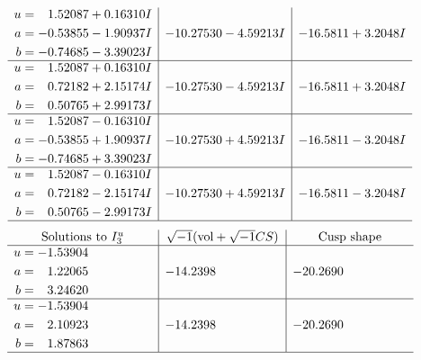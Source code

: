 \documentclass[1p]{elsarticle_modified}
\theoremstyle{definition}
\newcommand{\I}{\sqrt{-1}}
\begin{document}
$$\begin{array}{c|c|c}
\begin{aligned}
u &= \phantom{-}1.52087 + 0.16310 I \\
a &= -0.53855 - 1.90937 I \\
b &= -0.74685 - 3.39023 I\end{aligned}
 & -10.27530 - 4.59213 I & -16.5811 + 3.2048 I \\ \hline\begin{aligned}
u &= \phantom{-}1.52087 + 0.16310 I \\
a &= \phantom{-}0.72182 + 2.15174 I \\
b &= \phantom{-}0.50765 + 2.99173 I\end{aligned}
 & -10.27530 - 4.59213 I & -16.5811 + 3.2048 I \\ \hline\begin{aligned}
u &= \phantom{-}1.52087 - 0.16310 I \\
a &= -0.53855 + 1.90937 I \\
b &= -0.74685 + 3.39023 I\end{aligned}
 & -10.27530 + 4.59213 I & -16.5811 - 3.2048 I \\ \hline\begin{aligned}
u &= \phantom{-}1.52087 - 0.16310 I \\
a &= \phantom{-}0.72182 - 2.15174 I \\
b &= \phantom{-}0.50765 - 2.99173 I\end{aligned}
 & -10.27530 + 4.59213 I & -16.5811 - 3.2048 I\\
 \hline 
 \end{array}$$\newpage$$\begin{array}{c|c|c}  
\text{Solutions to }I^u_{3}& \I (\text{vol} + \sqrt{-1}CS) & \text{Cusp shape}\\
 \hline 
\begin{aligned}
u &= -1.53904\phantom{ +0.000000I} \\
a &= \phantom{-}1.22065\phantom{ +0.000000I} \\
b &= \phantom{-}3.24620\phantom{ +0.000000I}\end{aligned}
 & -14.2398\phantom{ +0.000000I} & -20.2690\phantom{ +0.000000I} \\ \hline\begin{aligned}
u &= -1.53904\phantom{ +0.000000I} \\
a &= \phantom{-}2.10923\phantom{ +0.000000I} \\
b &= \phantom{-}1.87863\phantom{ +0.000000I}\end{aligned}
 & -14.2398\phantom{ +0.000000I} & -20.2690\phantom{ +0.000000I}\\
 \hline 
 \end{array}$$\newpage
\end{document}

